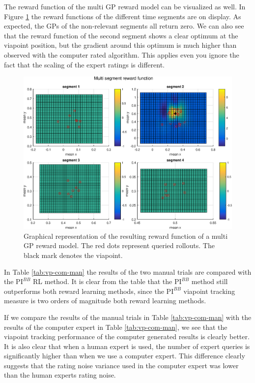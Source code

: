 \documentclass[mscThesis.tex]{subfiles}
\begin{document}
The reward function of the multi GP reward model can be visualized as well. In Figure \ref{fig:vp-multi-manual-reward} the reward functions of the different time segments are on display. As expected, the GPs of the non-relevant segments all return zero. We can also see that the reward function of the second segment shows a clear optimum at the viapoint position, but the gradient around this optimum is much higher than observed with the computer rated algorithm. This applies even you ignore the fact that the scaling of the expert ratings is different.


\begin{figure}[!htb]
\centering
\includegraphics[width=\textwidth, keepaspectratio=1]{figures/results/viapoint/return_flat_multi_manual.eps}
\caption{Graphical representation of the resulting reward function of a multi GP reward model. The red dots represent queried rollouts. The black mark denotes the viapoint.}
\label{fig:vp-multi-manual-reward}
\end{figure}

In Table \ref{tab:vp-com-man} the results of the two manual trials are compared with the $\text{PI}^{BB}$ RL method. It is clear from the table that the $\text{PI}^{BB}$ method still outperforms both reward learning methods, since the $\text{PI}^{BB}$ viapoint tracking measure is two orders of magnitude both reward learning methods. 

If we compare the results of the manual trials in Table \ref{tab:vp-com-man} with the results of the computer expert in Table \ref{tab:vp-com-man}, we see that the viapoint tracking performance of the computer generated results is clearly better. It is also clear that when a human expert is used, the number of expert queries is significantly higher than when we use a computer expert. This difference clearly suggests that the rating noise variance used in the computer expert was lower than the human experts rating noise.
\end{document}

